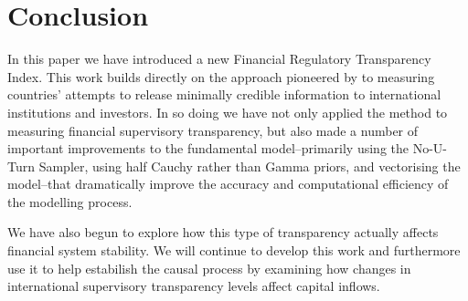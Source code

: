 \documentclass[a4paper]{article}
\begin{document}
\section*{Conclusion}

In this paper we have introduced a new Financial Regulatory Transparency Index. This work builds directly on the approach pioneered by \cite{Hollyer2014} to measuring countries' attempts to release minimally credible information to international institutions and investors. In so doing we have not only applied the method to measuring financial supervisory transparency, but also made a number of important improvements to the fundamental model--primarily using the No-U-Turn Sampler, using half Cauchy rather than Gamma priors, and vectorising the model--that dramatically improve the accuracy and computational efficiency of the modelling process.

We have also begun to explore how this type of transparency actually affects financial system stability. We will continue to develop this work and furthermore use it to help estabilish the causal process by examining how changes in international supervisory transparency levels affect capital inflows.



\end{document}
